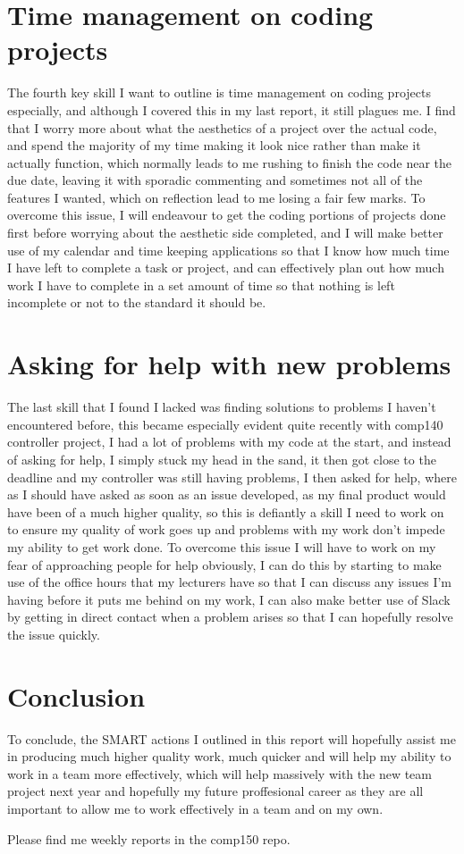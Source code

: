 \documentclass{scrartcl}
\begin{document}
\section{Time management on coding projects}
The fourth key skill I want to outline is time management on coding projects especially, and although I covered this in my last report, it still plagues me. I find that I worry more about what the aesthetics of a project over the actual code, and spend the majority of my time making it look nice rather than make it actually function, which normally leads to me rushing to finish the code near the due date, leaving it with sporadic commenting and sometimes not all of the features I wanted, which on reflection lead to me losing a fair few marks. To overcome this issue, I will endeavour to get the coding portions of projects done first before worrying about the aesthetic side completed, and I will make better use of my calendar and time keeping applications so that I know how much time I have left to complete a task or project, and can effectively plan out how much work I have to complete in a set amount of time so that nothing is left incomplete or not to the standard it should be. 

\section{Asking for help with new problems}
The last skill that I found I lacked was finding solutions to problems I haven't encountered before, this became especially evident quite recently with comp140 controller project, I had a lot of problems with my code at the start, and instead of asking for help, I simply stuck my head in the sand, it then got close to the deadline and my controller was still having problems, I then asked for help, where as I should have asked as soon as an issue developed, as my final product would have been of a much higher quality, so this is defiantly a skill I need to work on to ensure my quality of work goes up and problems with my work don't impede my ability to get work done. To overcome this issue I will have to work on my fear of approaching people for help obviously, I can do this by starting to make use of the office hours that my lecturers have so that I can discuss any issues I'm having before it puts me behind on my work, I can also make better use of Slack by getting in direct contact when a problem arises so that I can hopefully resolve the issue quickly. 

\section{Conclusion}
To conclude, the SMART actions I outlined in this report will hopefully assist me in producing much higher quality work, much quicker and will help my ability to work in a team more effectively, which will help massively with the new team project next year and hopefully my future proffesional career as they are all important to allow me to work effectively in a team and on my own. 

Please find me weekly reports in the comp150 repo.







\end{document}
